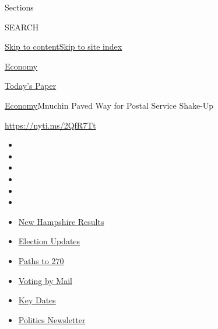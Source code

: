 Sections

SEARCH

\protect\hyperlink{site-content}{Skip to
content}\protect\hyperlink{site-index}{Skip to site index}

\href{https://www.nytimes3xbfgragh.onion/section/business/economy}{Economy}

\href{https://myaccount.nytimes3xbfgragh.onion/auth/login?response_type=cookie\&client_id=vi}{}

\href{https://www.nytimes3xbfgragh.onion/section/todayspaper}{Today's
Paper}

\href{/section/business/economy}{Economy}\textbar{}Mnuchin Paved Way for
Postal Service Shake-Up

\url{https://nyti.ms/2QfR7Tt}

\begin{itemize}
\item
\item
\item
\item
\item
\item
\end{itemize}

\begin{itemize}
\item
  \href{https://www.nytimes3xbfgragh.onion/interactive/2020/09/08/us/elections/results-new-hampshire-primary-elections.html?action=click\&pgtype=Article\&state=default\&region=TOP_BANNER\&context=storylines_menu}{New
  Hampshire Results}
\item
  \href{https://www.nytimes3xbfgragh.onion/live/2020/09/08/us/trump-vs-biden?action=click\&pgtype=Article\&state=default\&region=TOP_BANNER\&context=storylines_menu}{Election
  Updates}
\item
  \href{https://www.nytimes3xbfgragh.onion/interactive/2020/us/elections/election-states-biden-trump.html?action=click\&pgtype=Article\&state=default\&region=TOP_BANNER\&context=storylines_menu}{Paths
  to 270}
\item
  \href{https://www.nytimes3xbfgragh.onion/interactive/2020/08/31/us/politics/vote-by-mail-deadlines.html?action=click\&pgtype=Article\&state=default\&region=TOP_BANNER\&context=storylines_menu}{Voting
  by Mail}
\item
  \href{https://www.nytimes3xbfgragh.onion/interactive/2019/us/elections/2020-presidential-election-calendar.html?action=click\&pgtype=Article\&state=default\&region=TOP_BANNER\&context=storylines_menu}{Key
  Dates}
\item
  \href{https://www.nytimes3xbfgragh.onion/newsletters/politics?action=click\&pgtype=Article\&state=default\&region=TOP_BANNER\&context=storylines_menu}{Politics
  Newsletter}
\end{itemize}

